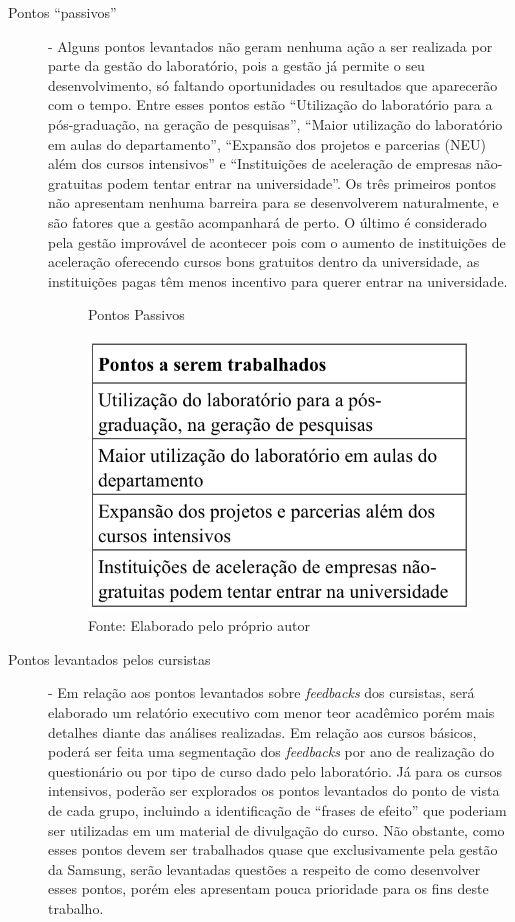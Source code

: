 \begin{description}

\item[Pontos \enquote{passivos}] - Alguns pontos levantados não geram nenhuma ação a ser realizada por parte da gestão do laboratório, pois a gestão já permite o seu desenvolvimento, só faltando oportunidades ou resultados que aparecerão com o tempo. Entre esses pontos estão \enquote{Utilização do laboratório para a pós-graduação, na geração de pesquisas}, \enquote{Maior utilização do laboratório em aulas do departamento}, \enquote{Expansão dos projetos e parcerias (NEU) além dos cursos intensivos} e \enquote{Instituições de aceleração de empresas não-gratuitas podem tentar entrar na universidade}. Os três primeiros pontos não apresentam nenhuma barreira para se desenvolverem naturalmente, e são fatores que a gestão acompanhará de perto. O último é considerado pela gestão improvável de acontecer pois com o aumento de instituições de aceleração oferecendo cursos bons gratuitos dentro da universidade, as instituições pagas têm menos incentivo para querer entrar na universidade.

\begin{figure}[H]
\caption{Pontos Passivos}
\centerline{\includegraphics[scale=0.75]{img/pontosselecionadospassivos}}
\label{fig:pontosselecionadospassivos}
\caption* {Fonte: Elaborado pelo próprio autor}
\end{figure}

\item[Pontos levantados pelos cursistas] - Em relação aos pontos levantados sobre \textit{feedbacks} dos cursistas, será elaborado um relatório executivo com menor teor acadêmico porém mais detalhes diante das análises realizadas. Em relação aos cursos básicos, poderá ser feita uma segmentação dos \textit{feedbacks} por ano de realização do questionário ou por tipo de curso dado pelo laboratório. Já para os cursos intensivos, poderão ser explorados os pontos levantados do ponto de vista de cada grupo, incluindo a identificação de \enquote{frases de efeito} que poderiam ser utilizadas em um material de divulgação do curso. Não obstante, como esses pontos devem ser trabalhados quase que exclusivamente pela gestão da Samsung, serão levantadas questões a respeito de como desenvolver esses pontos, porém eles apresentam pouca prioridade para os fins deste trabalho.


\end{description}
